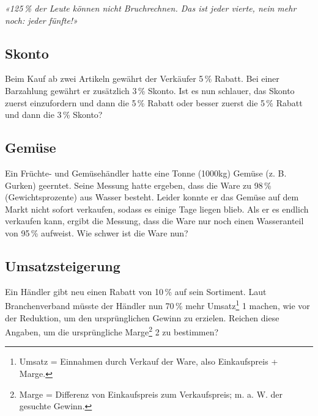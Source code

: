 \begin{center}\textit{«125\,\% der Leute können nicht Bruchrechnen. Das ist jeder vierte, nein mehr
noch: jeder fünfte!»}\end{center}


\subsection{Skonto}

Beim Kauf ab zwei Artikeln gewährt der Verkäufer 5\,\% Rabatt. Bei einer
Barzahlung gewährt er zusätzlich 3\,\% Skonto. Ist es nun schlauer, das Skonto
zuerst einzufordern und dann die 5\,\% Rabatt oder besser zuerst die 5\,\% Rabatt
und dann die 3\,\% Skonto?

\TNTeop{}

\subsection{Gemüse}
Ein Früchte- und Gemüsehändler hatte eine Tonne (1000kg) Gemüse (z. B.
Gurken) geerntet. Seine Messung hatte ergeben, dass die Ware zu 98\,\%\,
(Gewichtsprozente) aus Wasser besteht.
Leider konnte er das Gemüse auf dem Markt nicht sofort verkaufen, sodass es
einige Tage liegen blieb. Als er es endlich verkaufen kann, ergibt die Messung,
dass die Ware nur noch einen Wasseranteil von 95\,\% aufweist.
Wie schwer ist die Ware nun?

\TNTeop{}

\subsection{Umsatzsteigerung}
Ein Händler gibt neu einen Rabatt von 10\,\% auf sein Sortiment. Laut
Branchenverband müsste der Händler nun 70\,\% mehr Umsatz\footnote{Umsatz = Einnahmen durch Verkauf der Ware, also Einkaufspreis + Marge.} 1 machen, wie vor
der Reduktion, um den ursprünglichen Gewinn zu erzielen.
Reichen diese Angaben, um die ursprüngliche Marge\footnote{Marge = Differenz von Einkaufspreis zum Verkaufspreis; m. a. W. der gesuchte
Gewinn.} 2 zu bestimmen?

\newpage


